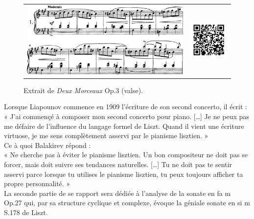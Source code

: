 \begin{figure}[!ht]
  \begin{bigcenter}
    \begin{tabular}{lr}
      \includegraphics[width=12.5cm, keepaspectratio]{liadov.png}
      &
      \includegraphics[width=3cm, keepaspectratio]{liadov-qr.png}
    \end{tabular}
  \end{bigcenter}
  \caption{\label{liadov}Extrait de \emph{Deux Morceaux} Op.3  (valse).}
\end{figure}

\indent Lorsque Liapounov commence en 1909 l'écriture de son second concerto, il écrit :\\
\indent« J'ai commençé à composer mon second concerto pour piano. [\dots] Je ne peux pas me défaire de l'influence du langage formel de Liszt. Quand il vient une écriture virtuose, je me sens complètement asservi par le pianisme lisztien. »\\

\indent Ce à quoi Balakirev répond :\\
\indent« Ne cherche pas à éviter le pianisme lisztien. Un bon compositeur ne doit pas se forcer, mais doit suivre ses tendances naturelles. [\dots] Tu ne doit pas te sentir asservi parce lorsque tu utilises le pianisme lisztien, tu peux toujours afficher ta propre personnalité. »\\

La seconde partie de se rapport sera dédiée à l'analyse de la sonate en fa m Op.27 qui, par sa structure cyclique et complexe, évoque la géniale sonate en si m S.178 de Liszt.\\

